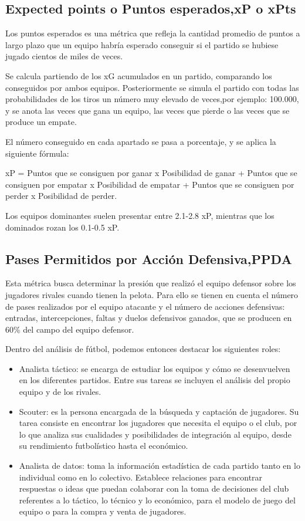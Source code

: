 \subsection{Expected points o Puntos esperados,xP o xPts}
Los puntos esperados es una métrica que refleja la cantidad 
promedio de puntos a largo plazo que un equipo habría 
esperado conseguir si el partido se hubiese jugado cientos de miles de veces.

Se calcula partiendo de los xG acumulados en un partido, comparando 
los conseguidos por ambos equipos. Posteriormente se simula 
el partido con todas las probabilidades de los tiros un número 
muy elevado de veces,por ejemplo: 100.000, y se anota las veces 
que gana un equipo, las veces que pierde o las veces que 
se produce un empate.

El número conseguido en cada apartado se pasa a porcentaje, 
y se aplica la siguiente fórmula:

xP = Puntos que se consiguen por ganar x Posibilidad de ganar + 
     Puntos que se consiguen por empatar x Posibilidad de empatar + 
     Puntos que se consiguen por perder x Posibilidad de perder.

Los equipos dominantes suelen presentar entre 2.1-2.8 xP, mientras 
que los dominados rozan los 0.1-0.5 xP. 

\subsection{Pases Permitidos por Acción Defensiva,PPDA}
Esta métrica busca determinar la presión que realizó el 
equipo defensor sobre los jugadores rivales cuando 
tienen la pelota. Para ello se tienen en cuenta el número 
de pases realizados por el equipo atacante y el número de 
acciones defensivas: entradas, intercepciones, faltas y duelos 
defensivos ganados, que se producen en 60\% del campo del 
equipo defensor.

Dentro del análisis de fútbol, podemos entonces destacar los siguientes roles:

\begin{itemize}
    \item Analista táctico: se encarga de estudiar los equipos y cómo 
    se desenvuelven en los diferentes partidos. Entre sus tareas se 
    incluyen el análisis del propio equipo y de los rivales.
    \item Scouter: es la persona encargada de la búsqueda y captación 
    de jugadores. Su tarea consiste en encontrar los jugadores que 
    necesita el equipo o el club, por lo que analiza sus cualidades 
    y posibilidades de integración al equipo, desde su rendimiento 
    futbolístico hasta el económico.
    \item Analista de datos: toma la información estadística de 
    cada partido tanto en lo individual como en lo colectivo. 
    Establece relaciones para encontrar respuestas o ideas que 
    puedan colaborar con la toma de decisiones del club referentes 
    a lo táctico, lo técnico y lo económico, para el modelo de 
    juego del equipo o para la compra y venta de jugadores.
\end{itemize}

